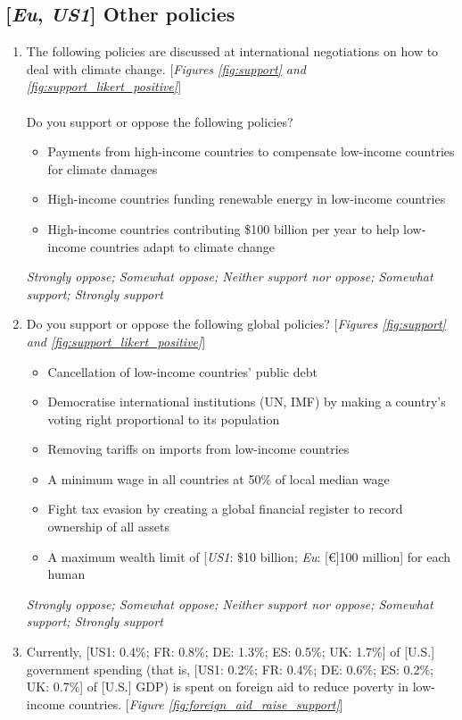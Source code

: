 \subsection*{[\textit{Eu}, \textit{US1}] Other policies}
\begin{enumerate}[resume] \item \label{q:climate_policies} The following policies are discussed  at international negotiations on how to deal with climate change. [\textit{Figures \ref{fig:support} and \ref{fig:support_likert_positive}}]\\
\\
Do you support or oppose the following policies?
\begin{itemize}
    \item Payments from high-income countries to compensate low-income countries for climate damages 
    \item High-income countries funding renewable energy in low-income countries
    \item High-income countries contributing \$100 billion per year to help low-income countries adapt to climate change
\end{itemize}
\textit{Strongly oppose; Somewhat oppose; Neither support nor oppose; Somewhat support; Strongly support}
\item \label{q:other_policies} Do you support or oppose the following global policies? [\textit{Figures \ref{fig:support} and \ref{fig:support_likert_positive}}]
\begin{itemize}
    \item Cancellation of low-income countries' public debt 
    \item Democratise international institutions (UN, IMF) by making a country's voting right proportional to its population 
    \item Removing tariffs on imports from low-income countries
    \item A minimum wage in all countries at 50\% of local median wage
    \item Fight tax evasion by creating a global financial register to record ownership of all assets
    \item A maximum wealth limit of [\textit{US1}: \$10 billion; \textit{Eu}: [\euro{}]100 million] for each human 
\end{itemize}
\textit{Strongly oppose; Somewhat oppose; Neither support nor oppose; Somewhat support; Strongly support}
\item \label{q:foreign_aid_raise_support} Currently, [US1: 0.4\%; FR: 0.8\%; DE: 1.3\%; ES: 0.5\%; UK: 1.7\%] of [U.S.] government spending (that is, [US1: 0.2\%; FR: 0.4\%; DE: 0.6\%; ES: 0.2\%; UK: 0.7\%] of [U.S.] GDP) is spent on foreign aid to reduce poverty in low-income countries. [\textit{Figure \ref{fig:foreign_aid_raise_support}}]\\

\end{enumerate}
